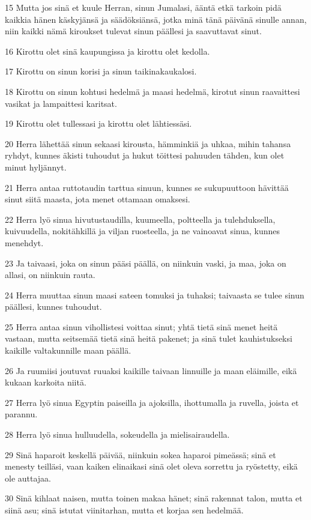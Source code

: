 \par 15 Mutta jos sinä et kuule Herran, sinun Jumalasi, ääntä etkä tarkoin pidä kaikkia hänen käskyjänsä ja säädöksiänsä, jotka minä tänä päivänä sinulle annan, niin kaikki nämä kiroukset tulevat sinun päällesi ja saavuttavat sinut.
\par 16 Kirottu olet sinä kaupungissa ja kirottu olet kedolla.
\par 17 Kirottu on sinun korisi ja sinun taikinakaukalosi.
\par 18 Kirottu on sinun kohtusi hedelmä ja maasi hedelmä, kirotut sinun raavaittesi vasikat ja lampaittesi karitsat.
\par 19 Kirottu olet tullessasi ja kirottu olet lähtiessäsi.
\par 20 Herra lähettää sinun sekaasi kirousta, hämminkiä ja uhkaa, mihin tahansa ryhdyt, kunnes äkisti tuhoudut ja hukut töittesi pahuuden tähden, kun olet minut hyljännyt.
\par 21 Herra antaa ruttotaudin tarttua sinuun, kunnes se sukupuuttoon hävittää sinut siitä maasta, jota menet ottamaan omaksesi.
\par 22 Herra lyö sinua hivutustaudilla, kuumeella, poltteella ja tulehduksella, kuivuudella, nokitähkillä ja viljan ruosteella, ja ne vainoavat sinua, kunnes menehdyt.
\par 23 Ja taivaasi, joka on sinun pääsi päällä, on niinkuin vaski, ja maa, joka on allasi, on niinkuin rauta.
\par 24 Herra muuttaa sinun maasi sateen tomuksi ja tuhaksi; taivaasta se tulee sinun päällesi, kunnes tuhoudut.
\par 25 Herra antaa sinun vihollistesi voittaa sinut; yhtä tietä sinä menet heitä vastaan, mutta seitsemää tietä sinä heitä pakenet; ja sinä tulet kauhistukseksi kaikille valtakunnille maan päällä.
\par 26 Ja ruumiisi joutuvat ruuaksi kaikille taivaan linnuille ja maan eläimille, eikä kukaan karkoita niitä.
\par 27 Herra lyö sinua Egyptin paiseilla ja ajoksilla, ihottumalla ja ruvella, joista et parannu.
\par 28 Herra lyö sinua hulluudella, sokeudella ja mielisairaudella.
\par 29 Sinä haparoit keskellä päivää, niinkuin sokea haparoi pimeässä; sinä et menesty teilläsi, vaan kaiken elinaikasi sinä olet oleva sorrettu ja ryöstetty, eikä ole auttajaa.
\par 30 Sinä kihlaat naisen, mutta toinen makaa hänet; sinä rakennat talon, mutta et siinä asu; sinä istutat viinitarhan, mutta et korjaa sen hedelmää.
